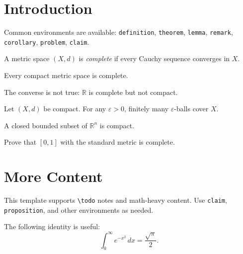 \section{Introduction}

Common environments are available: \texttt{definition}, \texttt{theorem}, \texttt{lemma},
\texttt{remark}, \texttt{corollary}, \texttt{problem}, \texttt{claim}.

\begin{definition}
    A metric space $(X, d)$ is \emph{complete} if every Cauchy sequence converges in $X$.
\end{definition}

\begin{theorem}
    Every compact metric space is complete.
\end{theorem}

\begin{remark}
    The converse is not true: $\mathbb{R}$ is complete but not compact.
\end{remark}

\begin{lemma}
    Let $(X,d)$ be compact. For any $\varepsilon>0$, finitely many $\varepsilon$-balls cover $X$.
\end{lemma}

\begin{corollary}
    A closed bounded subset of $\mathbb{R}^n$ is compact.
\end{corollary}

\begin{problem}
    Prove that $[0,1]$ with the standard metric is complete.
\end{problem}

\section{More Content}

This template supports \texttt{\textbackslash todo} notes and
math-heavy content. Use \texttt{claim}, \texttt{proposition}, and other environments as needed.

The following identity is useful:
\[
    \int_0^\infty e^{-x^2}\,dx = \frac{\sqrt{\pi}}{2}.
\]
